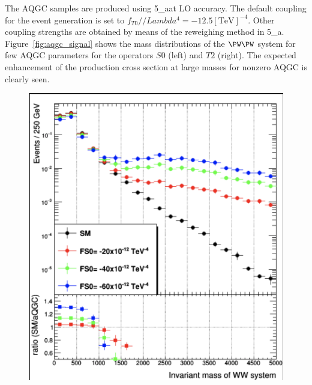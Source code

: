 The AQGC samples are produced using \MADGRAPH{}5\_a\MCATNLO at LO accuracy. The default coupling for the event generation is set to $f_{T0} / /Lambda^{4} = -12.5 [\mathrm{TeV}]^{-4}$. Other coupling strengths are obtained by means of the reweighing method in \MADGRAPH{}5\_a\MCATNLO. Figure~\ref{fig:aqgc_signal} shows the mass distributions of the  $\PW \PW$ system for few AQGC parameters for the operators $S0$ (left) and $T2$ (right). The expected enhancement of the production cross section at large masses for nonzero AQGC is clearly seen.      
  
\begin{figure}[htb]
\centering
\includegraphics[width=\cmsFigWidth]{Plots/aQGC_Signal_Scaling/mWW_FS0.png}

\end{figure}

